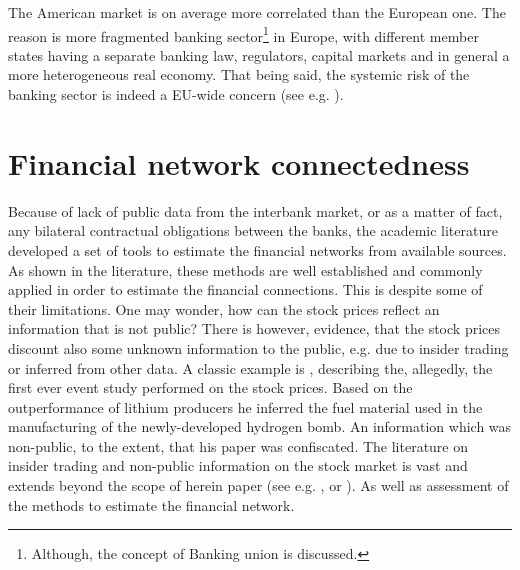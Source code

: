 \documentclass[12pt]{article}
\begin{document}
The American market is on average more correlated than the European one. The reason is more fragmented banking sector\footnote{Although, the concept of Banking union is discussed.} in Europe, with different member states having a separate banking law, regulators, capital markets and in general a more heterogeneous real economy. That being said, the systemic risk of the banking sector is indeed a EU-wide concern (see e.g. \cite{song21}). 


\section{Financial network connectedness}\label{section:fin_network}

Because of lack of public data from the interbank market, or as a matter of fact, any bilateral contractual obligations between the banks, the academic literature developed a set of tools to estimate the financial networks from available sources. As shown in the literature, these methods are well established and commonly applied in order to estimate the financial connections. This is despite some of their limitations. One may wonder, how can the stock prices reflect an information that is not public? There is however, evidence, that the stock prices discount also some unknown information to the public, e.g. due to insider trading or inferred from other data. A classic example is \cite{newhard14}, describing the, allegedly, the first ever event study performed on the stock prices. Based on the outperformance of lithium producers he inferred the fuel material used in the manufacturing of the newly-developed hydrogen bomb. An information which was non-public, to the extent, that his paper was confiscated. The literature on insider trading and non-public information on the stock market is vast and extends beyond the scope of herein paper (see e.g. \cite{hawk90}, \cite{huddart07} or \cite{klein20}). As well as assessment of the methods to estimate the financial network.
\end{document}
